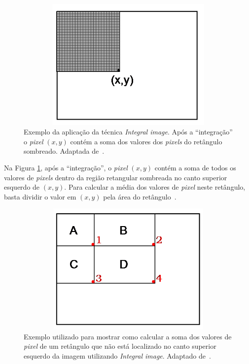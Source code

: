 	\begin{figure}[hbt]
		\begin{center}
			\includegraphics[height=6.5cm,width=12.5cm]{figuras/2.FundamentacaoTeorica/integral_image.png}
		\end{center}
		\caption{Exemplo da aplicação da técnica \textit{Integral image}. Após a ``integração'' o \textit{pixel} $\displaystyle (x,y)$ contém a soma dos valores dos \textit{pixels} do retângulo sombreado. Adaptada de~\cite{servodetection}.}
		\label{integralimage}
	\end{figure}

Na Figura \ref{integralimage}, após a ``integração'', o \textit{pixel} $\displaystyle (x,y)$ contém a soma de todos os valores de \textit{pixels} dentro da região retangular sombreada no canto superior esquerdo de $\displaystyle (x,y)$. Para calcular a média dos valores de \textit{pixel} neste retângulo, basta dividir o valor em $\displaystyle (x,y)$ pela área do retângulo~\cite{servodetection}.

	\begin{figure}[hbt]
		\begin{center}
			\includegraphics[height=6.5cm,width=12.5cm]{figuras/2.FundamentacaoTeorica/integral_image2.png}
		\end{center}
		\caption{Exemplo utilizado para mostrar como calcular a soma dos valores de \textit{pixel} de um retângulo que não está localizado no canto superior esquerdo da imagem utilizando \textit{Integral image}. Adaptado de~\cite{servodetection}.}
		\label{integralimage2}
	\end{figure}

